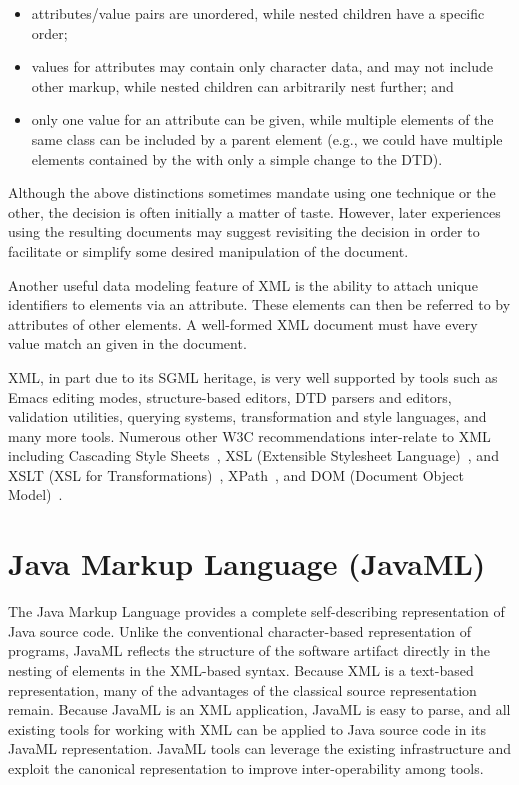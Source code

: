 \documentclass{article}
\begin{document}
\begin{itemize}

\item attributes/value pairs are unordered, while nested children have a
specific order;

\item values for attributes may contain only character data, and may not
      include other markup, while nested children can arbitrarily nest
      further; and
      
\item only one value for an attribute can be given, while multiple
      elements of the same class can be included by a parent element
      (e.g., we could have multiple  elements contained by
      the  with only a simple change to the DTD).

\end{itemize}

Although the above distinctions sometimes mandate using one technique or
the other, the decision is often initially a matter of taste.  However,
later experiences using the resulting documents may suggest revisiting
the decision in order to facilitate or simplify some desired
manipulation of the document.

Another useful data modeling feature of XML is the ability to attach
unique identifiers to elements via an  attribute.  These
elements can then be referred to by  attributes of other
elements.  A well-formed XML document must have every 
value match an  given in the document.

XML, in part due to its SGML heritage, is very well supported by tools
such as Emacs editing modes, structure-based editors, DTD parsers and
editors, validation utilities, querying systems, transformation and
style languages, and many more tools.  Numerous other W3C
recommendations inter-relate to XML including Cascading Style
Sheets~\cite{CSS2}, XSL (Extensible Stylesheet Language)~\cite{XSL}, and
XSLT (XSL for Transformations)~\cite{XSLT}, XPath~\cite{XPath}, and DOM
(Document Object Model)~\cite{DOM}.

\section{Java Markup Language (JavaML)}
\label{sec-javaml}

The Java Markup Language provides a complete self-describing
representation of Java source code.  Unlike the conventional
character-based representation of programs, JavaML reflects the
structure of the software artifact directly in the nesting of elements
in the XML-based syntax.  Because XML is a text-based representation,
many of the advantages of the classical source representation remain.
Because JavaML is an XML application, JavaML is easy to parse, and all
existing tools for working with XML can be applied to Java source code
in its JavaML representation.  JavaML tools can leverage the existing
infrastructure and exploit the canonical representation to improve
inter-operability among tools.
\end{document}

